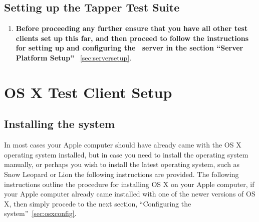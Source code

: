 \newpage
\subsection{Setting up the Tapper Test Suite}
\label{sec:debiantestsuite}
\begin{enumerate}
\item 	{\bf Before proceeding any further ensure that you have all other test clients set up this far, and then proceed
		to follow the instructions for setting up and configuring the \tapper~server in the section ``Server Platform Setup''}		
		~\ref{sec:serversetup}.
\end{enumerate}




\newpage
\section{OS X Test Client Setup}
\subsection{Installing the system}
\label{sec:osxinstall}

In most cases your Apple computer should have already came with the OS X operating system installed, but in case you need to
install the operating system manually, or perhaps you wish to install the latest operating system, such as Snow Leopard or Lion
the following instructions are provided. The following instructions outline the procedure for installing OS X on your Apple computer, 
if your Apple computer already came installed with one of the newer versions of OS X, then simply procede to the next section,
``Configuring the system''~\ref{sec:osxconfig}.

